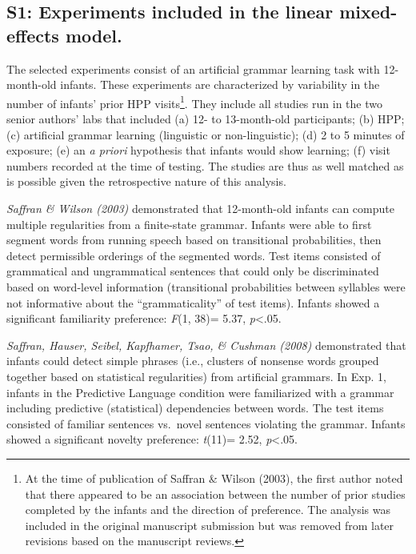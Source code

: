 \clearpage
\makeatletter
\efloat@restorefloats
\makeatother


\begin{appendix}
\section{}
\hypertarget{s1-experiments-included-in-the-linear-mixed-effects-model.}{%
\subsection{S1: Experiments included in the linear mixed-effects
model.}\label{s1-experiments-included-in-the-linear-mixed-effects-model.}}

The selected experiments consist of an artificial grammar learning task
with 12-month-old infants. These experiments are characterized by
variability in the number of infants' prior HPP visits\footnote{At the
  time of publication of Saffran \& Wilson (2003), the first author
  noted that there appeared to be an association between the number of
  prior studies completed by the infants and the direction of
  preference. The analysis was included in the original manuscript
  submission but was removed from later revisions based on the
  manuscript reviews.}. They include all studies run in the two senior
authors' labs that included (a) 12- to 13-month-old participants; (b)
HPP; (c) artificial grammar learning (linguistic or non-linguistic); (d)
2 to 5 minutes of exposure; (e) an \emph{a priori} hypothesis that
infants would show learning; (f) visit numbers recorded at the time of
testing. The studies are thus as well matched as is possible given the
retrospective nature of this analysis.

\emph{Saffran \& Wilson (2003)} demonstrated that 12-month-old infants
can compute multiple regularities from a finite-state grammar. Infants
were able to first segment words from running speech based on
transitional probabilities, then detect permissible orderings of the
segmented words. Test items consisted of grammatical and ungrammatical
sentences that could only be discriminated based on word-level
information (transitional probabilities between syllables were not
informative about the ``grammaticality'' of test items). Infants showed
a significant familiarity preference: \emph{F}(1, 38)= 5.37,
\emph{p}\textless{}.05.

\emph{Saffran, Hauser, Seibel, Kapfhamer, Tsao, \& Cushman (2008)}
demonstrated that infants could detect simple phrases (i.e., clusters of
nonsense words grouped together based on statistical regularities) from
artificial grammars. In Exp. 1, infants in the Predictive Language
condition were familiarized with a grammar including predictive
(statistical) dependencies between words. The test items consisted of
familiar sentences vs.~novel sentences violating the grammar. Infants
showed a significant novelty preference: \emph{t}(11)= 2.52,
\emph{p}\textless{}.05.


\end{appendix}
